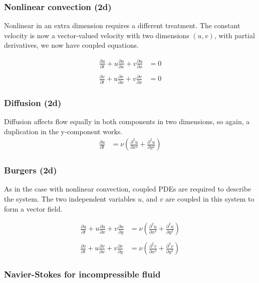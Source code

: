 \documentclass[11pt]{article}
\begin{document}
\subsubsection{Nonlinear convection (2d)}
Nonlinear in an extra dimension requires a different treatment.
The constant velocity is now a vector-valued velocity with two dimensions
$(u, v)$, with partial derivatives, we now have coupled equations.

\begin{align}
\frac{\partial u}{\partial t} + u\frac{\partial u}{\partial x}  + v\frac{\partial u}{\partial x} 
&= 0		\nonumber \\ \nonumber\\
\frac{\partial v}{\partial t} + u\frac{\partial v}{\partial x}  + v\frac{\partial v}{\partial x} 
&= 0
	\label{2d_nonlinconv}
\end{align}

\subsubsection{Diffusion (2d)}
Diffusion affects flow equally in both components in two dimensions, so
again, a duplication in the y-component works.
\begin{align}
\frac{\partial u}{\partial t} &= \nu \left(\frac{\partial^2 u}{\partial x^2} + \frac{\partial^2 u}{\partial y^2}\right)		\label{2d_diffusion}
\end{align}

\subsubsection{Burgers (2d)}
As in the case with nonlinear convection, coupled PDEs are required to
describe the system. The two independent variables $u$, and $v$ are coupled
in this system to form a vector field.

\begin{align}
\frac{\partial u}{\partial t} + u \frac{\partial u}{\partial x} + v \frac{\partial u}{\partial y}
&= \nu \left(\frac{\partial^2 u}{\partial x^2} + \frac{\partial^2 u}{\partial y^2}\right)
\nonumber \\ \nonumber \\
\frac{\partial v}{\partial t} + u \frac{\partial v}{\partial x} + v \frac{\partial v}{\partial y}
&= \nu \left(\frac{\partial^2 v}{\partial x^2} + \frac{\partial^2 v}{\partial y^2}\right)	\label{2d_Burgers}
\end{align}

\subsubsection{Navier-Stokes for incompressible fluid}
\end{document}
